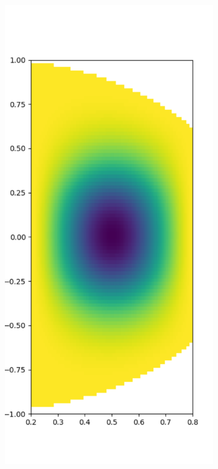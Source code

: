 \documentclass[11pt, oneside]{article}   	%
\begin{document}
\begin{figure}[t]
	\begin{subfigure}{0.3\textwidth}
	\centering
	\includegraphics[scale=0.3]{solution-biharmonic-diskslice-alpha=0p2-beta=0p8}

\end{subfigure}
\end{figure}
\end{document}
